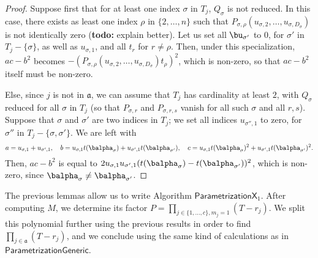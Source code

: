 \documentclass[12pt]{article}
\newcommand{\todo}[1]{\textcolor{red}{#1}}
\def\todo#1{(\textbf{todo:} #1)}
\begin{document}
\begin{proof}
	Suppose first that for at least one index $\sigma$ in $T_j$,
	$Q_\sigma$ is not reduced. In this case, there exists as least one
	index $\rho$ in $\{2,\dots,n\}$ such that
	$P_{\sigma,\rho}(u_{\sigma,2},\dots,u_{\sigma,D_\sigma})$ is not
	identically zero \todo{explain better}. Let us set all $\bu_{\sigma'}$
	to $0$, for $\sigma'$ in $T_j-\{\sigma\}$, as well as $u_{\sigma,1}$,
	and all $t_r$ for $r\ne \rho$. Then, under this specialization,
	$ac-b^2$ becomes
	$-(P_{\sigma,\rho}(u_{\sigma,2},\dots,u_{\sigma,D_\sigma})t_\rho)^2$,
	which is non-zero, so that $ac-b^2$ itself must be non-zero.
	
	Else, since $j$ is not in $\mathfrak{a}$, we can assume that $T_j$
	has cardinality at least $2$, with $Q_\sigma$ reduced for all $\sigma$
	in $T_j$ (so that $P_{\sigma,r}$ and $P_{\sigma,r,s}$ vanish for 
	all such $\sigma$ and all $r,s$). Suppose that $\sigma$ and $\sigma'$ are two indices in
	$T_j$; we set all indices $u_{\sigma'',1}$ to zero, for $\sigma''$
	in $T_j-\{\sigma,\sigma'\}$. We are left with
	$$
	a=u_{\sigma,1}+u_{\sigma',1},\quad
	b=u_{\sigma,1}t(\balpha_{\sigma})+u_{\sigma',1}t(\balpha_{\sigma'}),\quad
	c=u_{\sigma,1}t(\balpha_{\sigma})^2+u_{\sigma',1}t(\balpha_{\sigma'})^2.
	$$
	Then, $ac-b^2$ is equal to $2u_{\sigma,1}u_{\sigma',1}(t(\balpha_{\sigma})-t(\balpha_{\sigma'}))^2$,
	which is non-zero, since $\balpha_\sigma \ne \balpha_{\sigma'}$.
\end{proof}

The previous lemmas allow us to write Algorithm
$\mathsf{ParametrizationX}_1$. After computing $M$, we determine its
factor $P=\prod_{j \in \{1,\dots,c\}, m_j=1} (T-r_j)$. We split this
polynomial further using the previous results in order to find
$\prod_{j \in \mathfrak{a}} (T-r_j)$, and we conclude using the same
kind of calculations as in $\mathsf{ParametrizationGeneric}$.
\end{document}
